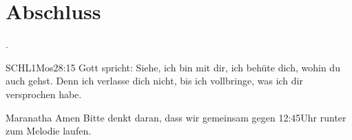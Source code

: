 \documentclass{../../inc/mybib}
\begin{document}







\section{Abschluss}

 .

\beten{}

\begin{bibelbox}{SCHL}{1Mos}{28:15}
    Gott spricht: Siehe, ich bin mit dir,
    ich behüte dich, wohin du auch gehst.
    Denn ich verlasse dich nicht,
    bis ich vollbringe, was ich dir versprochen habe.
\end{bibelbox}

Maranatha Amen
Bitte denkt daran, dass wir gemeinsam gegen 12:45Uhr runter zum Melodie laufen. 
\end{document}
